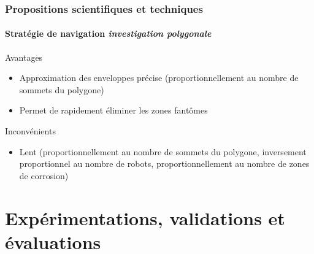 \documentclass{beamer}
\begin{document}
			\begin{frame}
				\frametitle{Propositions scientifiques et techniques}
				\framesubtitle{Stratégie de navigation \textit{investigation polygonale}}
				\begin{exampleblock}{Avantages}
					\begin{itemize}
						\item Approximation des enveloppes précise (proportionnellement au nombre de sommets du polygone)
						\item Permet de rapidement éliminer les zones fantômes
					\end{itemize}
				\end{exampleblock}
				\begin{alertblock}{Inconvénients}
					\begin{itemize}
						\item Lent (proportionnellement au nombre de sommets du polygone, inversement proportionnel au nombre de robots, proportionnellement au nombre de zones de corrosion)
					\end{itemize}
				\end{alertblock}
			\end{frame}
	\section{Expérimentations, validations et évaluations}
\end{document}
